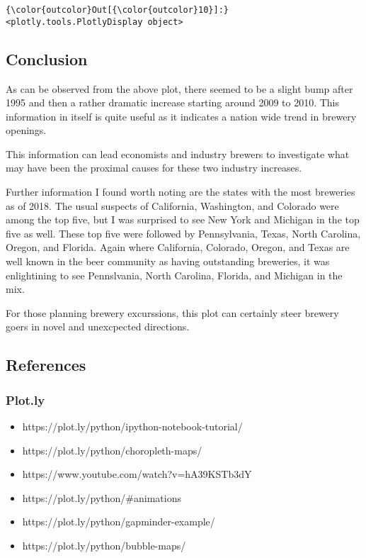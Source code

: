 \documentclass[11pt]{article}
\providecommand{\tightlist}{%
      \setlength{\itemsep}{0pt}\setlength{\parskip}{0pt}}
\begin{document}
\begin{Verbatim}[commandchars=\\\{\}]
{\color{outcolor}Out[{\color{outcolor}10}]:} <plotly.tools.PlotlyDisplay object>
\end{Verbatim}
            
    \subsection{Conclusion}\label{conclusion}

As can be observed from the above plot, there seemed to be a slight bump
after 1995 and then a rather dramatic increase starting around 2009 to
2010. This information in itself is quite useful as it indicates a
nation wide trend in brewery openings.

This information can lead economists and industry brewers to investigate
what may have been the proximal causes for these two industry increases.

Further information I found worth noting are the states with the most
breweries as of 2018. The usual suspects of California, Washington, and
Colorado were among the top five, but I was surprised to see New York
and Michigan in the top five as well. These top five were followed by
Pennsylvania, Texas, North Carolina, Oregon, and Florida. Again where
California, Colorado, Oregon, and Texas are well known in the beer
community as having outstanding breweries, it was enlightining to see
Pennslvania, North Carolina, Florida, and Michigan in the mix.

For those planning brewery excurssions, this plot can certainly steer
brewery goers in novel and unexcpected directions.

     

    \subsection{References}\label{references}

\subsubsection{Plot.ly}\label{plot.ly}

\begin{itemize}
\tightlist
\item
  https://plot.ly/python/ipython-notebook-tutorial/
\item
  https://plot.ly/python/choropleth-maps/
\item
  https://www.youtube.com/watch?v=hA39KSTb3dY
\item
  https://plot.ly/python/\#animations
\item
  https://plot.ly/python/gapminder-example/
\item
  https://plot.ly/python/bubble-maps/
\end{itemize}
\end{document}
